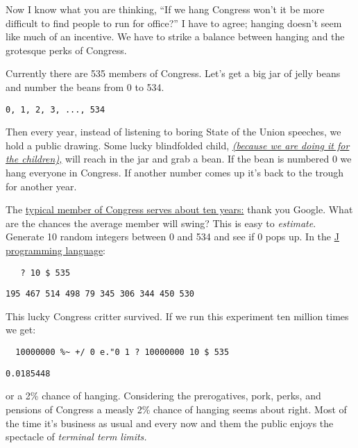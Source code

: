 Now I know what you are thinking, ``If we hang Congress won't it be more
difficult to find people to run for office?'' I have to agree; hanging
doesn't seem like much of an incentive. We have to strike a balance
between hanging and the grotesque perks of Congress.

Currently there are 535 members of Congress. Let's get a big jar of
jelly beans and number the beans from 0 to 534.

\begin{verbatim}
0, 1, 2, 3, ..., 534
\end{verbatim}
Then every year, instead of listening to boring State of the Union
speeches, we hold a public drawing. Some lucky blindfolded child,
\emph{\href{http://captaincapitalism.blogspot.com/2009/12/please-stop-it-with-think-of-children.html}{(because
we are doing it for the children),}} will reach in the jar and grab a
bean. If the bean is numbered 0 we hang everyone in Congress. If another
number comes up it's back to the trough for another year.

The
\href{http://docs.google.com/viewer?a=v\&q=cache:P925W\_GMcNwJ:www.senate.gov/reference/resources/pdf/RS22007.pdf+congress+term+average\&hl=en\&gl=us\&pid=bl\&srcid=ADGEESi6G0dwq2fAncmpqw--WUWGaARLZ2-1yYqExeYvjf\_P7ByhvGUlDSKP\_3sbbXFiMfjp6drsojRfNfILIRBkIl1L7ghstd6yoUirPblHoXFco1Q7gFEbNMKtQa55-cEjaT-MkuDi\&sig=AHIEtbSGxJ45QmhPawXiT2TOiB7zpp5u2A}{typical
member of Congress serves about ten years:} thank you Google. What are
the chances the average member will swing? This is easy to \emph{estimate}.
Generate 10 random integers between 0 and 534 and see if 0 pops up. In
the \href{http://www.jsoftware.com/}{J programming language}:

\begin{verbatim}
   ? 10 $ 535
\end{verbatim}
\begin{verbatim}
195 467 514 498 79 345 306 344 450 530
\end{verbatim}
This lucky Congress critter survived. If we run this experiment ten
million times we get:

\begin{verbatim}
  10000000 %~ +/ 0 e."0 1 ? 10000000 10 $ 535
\end{verbatim}
\begin{verbatim}
0.0185448
\end{verbatim}
or a 2\% chance of hanging. Considering the prerogatives, pork, perks,
and pensions of Congress a measly 2\% chance of hanging seems about
right. Most of the time it's business as usual and every now and them
the public enjoys the spectacle of \emph{terminal term limits.}



%